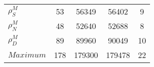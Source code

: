 \begin{center}
\begin{longtable}{lcccc}
$ {\rho^{M}_{S}}       $	 & 	                   53	 & 	                56349	 & 	                56402	 & 	                    9 \\ 
$ {\rho^{M}_{N}}       $	 & 	                   48	 & 	                52640	 & 	                52688	 & 	                    8 \\ 
$ {\rho^{M}_{D}}       $	 & 	                   89	 & 	                89960	 & 	                90049	 & 	                   10 \\ 
$Maximum               $	 & 	                  178	 & 	               179300	 & 	               179478	 & 	                   22 \\ 
\end{longtable}
 \end{center}
